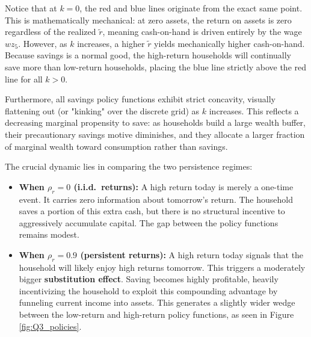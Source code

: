 \documentclass[11pt, a4paper]{article}
\begin{document}
Notice that at $k=0$, the red and blue lines originate from the exact same point. This is mathematically mechanical: at zero assets, the return on assets is zero regardless of the realized $\tilde{r}$, meaning cash-on-hand is driven entirely by the wage $wz_5$. However, as $k$ increases, a higher $\tilde{r}$ yields mechanically higher cash-on-hand. Because savings is a normal good, the high-return households will continually save more than low-return households, placing the blue line strictly above the red line for all $k>0$. 

Furthermore, all savings policy functions exhibit strict concavity, visually flattening out (or "kinking" over the discrete grid) as $k$ increases. This reflects a decreasing marginal propensity to save: as households build a large wealth buffer, their precautionary savings motive diminishes, and they allocate a larger fraction of marginal wealth toward consumption rather than savings.

The crucial dynamic lies in comparing the two persistence regimes:
\begin{itemize}
    \item \textbf{When $\rho_r = 0$ (i.i.d.\ returns):} A high return today is merely a one-time event. It carries zero information about tomorrow's return. The household saves a portion of this extra cash, but there is no structural incentive to aggressively accumulate capital. The gap between the policy functions remains modest.
    \item \textbf{When $\rho_r = 0.9$ (persistent returns):} A high return today signals that the household will likely enjoy high returns tomorrow. This triggers a moderately bigger \textbf{substitution effect}. Saving becomes highly profitable, heavily incentivizing the household to exploit this compounding advantage by funneling current income into assets. This generates a slightly wider wedge between the low-return and high-return policy functions, as seen in Figure \ref{fig:Q3_policies}.
\end{itemize}
\end{document}
